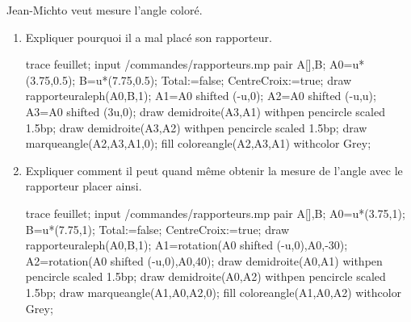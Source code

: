 \begin{exercice*}
   Jean-Michto veut mesure l'angle coloré.
   \begin{enumerate}
       \item Expliquer pourquoi il a mal placé son rapporteur.\\
       \begin{Geometrie}[CoinBG={(0,-3.5u)},CoinHD={(7.5u,4u)}]
         trace feuillet;
         input \persopath/commandes/rapporteurs.mp
         pair A[],B;
         A0=u*(3.75,0.5);
         B=u*(7.75,0.5);
         Total:=false;%
         CentreCroix:=true;%
         draw rapporteuraleph(A0,B,1);        
         A1=A0 shifted (-u,0); 
         A2=A0 shifted (-u,u);
         A3=A0 shifted (3u,0);
         draw demidroite(A3,A1) withpen pencircle scaled 1.5bp;
         draw demidroite(A3,A2) withpen pencircle scaled 1.5bp;
         draw marqueangle(A2,A3,A1,0);
         fill coloreangle(A2,A3,A1) withcolor Grey;
      \end{Geometrie}
      \par\vspace*{4mm}\dotfill
      \par\vspace*{4mm}\dotfill
      \item Expliquer comment il peut quand même obtenir la mesure de l'angle avec le rapporteur placer ainsi.\\\smallskip
      \begin{Geometrie}[CoinBG={(0,-3u)},CoinHD={(7.5u,4.5u)}]
         trace feuillet;
         input \persopath/commandes/rapporteurs.mp
         pair A[],B;
         A0=u*(3.75,1);
         B=u*(7.75,1);
         Total:=false;%
         CentreCroix:=true;%
         draw rapporteuraleph(A0,B,1);
         A1=rotation(A0 shifted (-u,0),A0,-30); 
         A2=rotation(A0 shifted (-u,0),A0,40);           
         draw demidroite(A0,A1) withpen pencircle scaled 1.5bp;
         draw demidroite(A0,A2) withpen pencircle scaled 1.5bp;
         draw marqueangle(A1,A0,A2,0);
         fill coloreangle(A1,A0,A2) withcolor Grey;
      \end{Geometrie}
      \par\vspace*{4mm}\dotfill
      \par\vspace*{4mm}\dotfill
      \par\vspace*{4mm}\dotfill
   \end{enumerate}
\end{exercice*}

